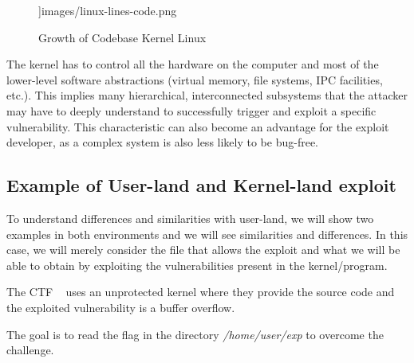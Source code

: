 \documentclass{masterthesis}
\begin{document}
\begin{itemize}
\begin{figure}[h!]
{  \textwidth]{images/linux-lines-code.png}}
   \caption{Growth of Codebase Kernel Linux}
   \label{line_code_graphview}
\end{figure} 
The kernel has to control all the hardware on the computer and most of the lower-level software
abstractions (virtual memory, file systems, IPC facilities, etc.). This implies many hierarchical, interconnected subsystems that the attacker may have to deeply understand to successfully trigger and exploit a specific
vulnerability. This characteristic can also become an advantage for the exploit developer, as a complex system is also less likely to be bug-free.
\end{itemize}
\subsection{Example of User-land and Kernel-land exploit}
\label{subsect:example_of_kernel_user_land}

To understand differences and similarities with user-land, we will show two examples in both environments and we will see similarities and differences. In this case, we will merely consider the file that allows the exploit and what we will be able to obtain by exploiting the vulnerabilities present in the kernel/program.

The CTF ~\cite{m0leconTeaser2020_babyk} uses an unprotected kernel where they provide the source code and the exploited vulnerability is a buffer overflow.

The goal is to read the flag in the directory \textit{/home/user/exp} to overcome the challenge.
\end{document}
